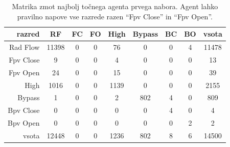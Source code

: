 \begin{table}[H]
    \centering
    \caption{Matrika zmot najbolj točnega agenta prvega nabora. Agent lahko pravilno napove vse razrede razen \enquote{Fpv Close} in \enquote{Fpv Open}.}
    \begin{tabular}{||rcccccccc||}
        \hline
        razred    & RF    & FC & FO & High & Bypass & BC & BO & vsota \\ \hline
        Rad Flow  & 11398 & 0  & 0  & 76   & 0      & 0  & 4  & 11478 \\ \hline
        Fpv Close & 9     & 0  & 0  & 4    & 0      & 0  & 0  & 13    \\ \hline
        Fpv Open  & 24    & 0  & 0  & 15   & 0      & 0  & 0  & 39    \\ \hline
        High      & 1016  & 0  & 0  & 1139 & 0      & 0  & 0  & 2155  \\ \hline
        Bypass    & 1     & 0  & 0  & 2    & 802    & 4  & 0  & 809   \\ \hline
        Bpv Close & 0     & 0  & 0  & 0    & 0      & 4  & 0  & 4     \\ \hline
        Bpv Open  & 0     & 0  & 0  & 0    & 0      & 0  & 2  & 2     \\ \hline
        vsota     & 12448 & 0  & 0  & 1236 & 802    & 8  & 6  & 14500 \\ \hline
    \end{tabular}
    \label{tab:statlog_acc_1}
\end{table}


